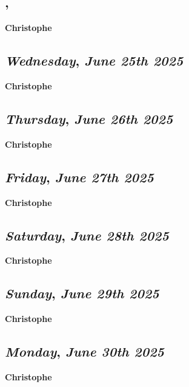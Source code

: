 \subsection*{\weekday, \day}
\textbf {Christophe}

\def\day{\textit{June 25th 2025}}
\def\weekday{\textit{Wednesday}}
\subsection*{\weekday, \day}
\textbf {Christophe}

\def\day{\textit{June 26th 2025}}
\def\weekday{\textit{Thursday}}
\subsection*{\weekday, \day}
\textbf {Christophe}

\def\day{\textit{June 27th 2025}}
\def\weekday{\textit{Friday}}
\subsection*{\weekday, \day}
\textbf {Christophe}

\def\day{\textit{June 28th 2025}}
\def\weekday{\textit{Saturday}}
\subsection*{\weekday, \day}
\textbf {Christophe}

\def\day{\textit{June 29th 2025}}
\def\weekday{\textit{Sunday}}
\subsection*{\weekday, \day}
\textbf {Christophe}

\def\day{\textit{June 30th 2025}}
\def\weekday{\textit{Monday}}
\subsection*{\weekday, \day}
\textbf {Christophe}
